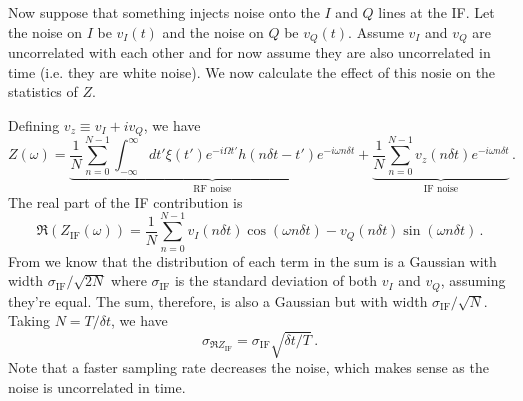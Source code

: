 
Now suppose that something injects noise onto the $I$ and $Q$ lines at the IF.
Let the noise on $I$ be $v_I(t)$ and the noise on $Q$ be $v_Q(t)$.
Assume $v_I$ and $v_Q$ are uncorrelated with each other and for now assume they are also uncorrelated in time (i.e. they are white noise).
We now calculate the effect of this nosie on the statistics of $Z$.

Defining $v_z \equiv v_I + i v_Q$, we have
\begin{equation}
Z(\omega) =
\underbrace{\frac{1}{N}\sum_{n=0}^{N-1}\int_{-\infty}^\infty dt' \xi(t')
e^{-i \Omega t'} h(n \delta t - t') e^{-i \omega n \delta t}
}_\text{RF noise}
+
\underbrace{
\frac{1}{N} \sum_{n=0}^{N-1} v_z(n \delta t) e^{-i \omega n \delta t}
}_\text{IF noise}
\, .
\end{equation}
The real part of the IF contribution is
\begin{equation}
  \Re \left( Z_\text{IF} (\omega) \right) = \frac{1}{N} \sum_{n=0}^{N-1}
      v_I(n \delta t) \cos(\omega n \delta t)
    - v_Q(n \delta t) \sin(\omega n \delta t)
  \, .
\end{equation}
From \cite{Sank:whiteNoiseDFT} we know that the distribution of each term in the sum is a Gaussian with width $\sigma_\text{IF} / \sqrt{2N}$ where $\sigma_\text{IF}$ is the standard deviation of both $v_I$ and $v_Q$, assuming they're equal.
The sum, therefore, is also a Gaussian but with width $\sigma_\text{IF} / \sqrt{N}$.
Taking $N = T / \delta t$, we have
\begin{equation}
  \sigma_{\Re Z_\text{IF}} = \sigma_\text{IF} \sqrt{\delta t / T} \, .
\end{equation}
Note that a faster sampling rate decreases the noise, which makes sense as the noise is uncorrelated in time.
